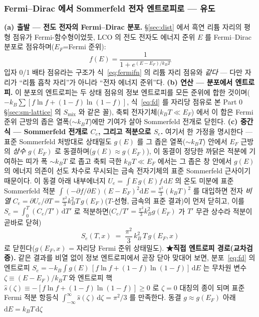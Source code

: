 \documentclass[11pt,a4paper]{article}
\newcommand{\dd}{\mathrm{d}}
\begin{document}
\subsubsection{Fermi--Dirac 에서 Sommerfeld 전자 엔트로피로 — 유도}\label{sec:lco-Se}
\textbf{(a) 출발 — 전도 전자의 Fermi--Dirac 분포.} \S\ref{sec:dist} 에서 흑연 리튬 자리의 평형 점유가 Fermi-함수형이었듯, LCO 의 전도 전자도 에너지 준위 $E$ 를
Fermi--Dirac 분포로 점유하며($E_F$=Fermi 준위):
\begin{equation}
f(E)=\frac{1}{1+e^{(E-E_F)/k_BT}}
\label{eq:fd}
\end{equation}
입자 0/1 배타 점유라는 구조가 식~\eqref{eq:fermifn} 의 리튬 자리 점유와 \emph{같다} — 다만 자리가 ``리튬 흡착
자리''가 아니라 ``전자 에너지 준위''다. \textbf{(b) 연산 — 분포에서 엔트로피.} 이 분포의 엔트로피는 두 상태 점유의 정보 엔트로피를 모든 준위에 합한 것이며($-k_B\sum[f\ln f+(1-f)\ln(1-f)]$,
식~\eqref{eq:fd} 를 자리당 점유로 본 Part 0 \S\ref{sec:sm-lattice} 의 $S_\mathrm{mix}$ 와 같은 꼴), 축퇴 전자기체($k_BT\!\ll\!E_F$)
에서 이 합은 Fermi 준위 근방의 좁은 열폭($\sim k_BT$)에만 기여가 살아 Sommerfeld 전개로 닫힌다. \textbf{(c) 중간식 — Sommerfeld 전개로 $C_e$, 그리고 적분으로 $S_e$.}
여기서 한 가정을 명시한다 — 표준 Sommerfeld 처방대로 상태밀도 $g(E)$ 를 그 좁은 열폭($\sim k_BT$) 안에서 $E_F$
근방의 \emph{상수} $g(E_F)$ 로 동결하며($g(E)\approx g(E_F)$), 이 동결이 정당한 까닭은 적분에 기여하는 띠가 폭
$\sim k_BT$ 로 좁고 축퇴 극한 $k_BT\!\ll\!E_F$ 에서는 그 좁은 창 안에서 $g(E)$ 의 에너지 의존이 선도 차수로
무시되는 금속 전자기체의 표준 Sommerfeld 근사이기 때문이다. 이 동결 아래 내부에너지 $U_e=\int E\,g(E)f\,\dd E$ 의
온도 미분에 표준 Sommerfeld 적분 $\int(-\partial f/\partial E)(E-E_F)^2\dd E=\tfrac{\pi^2}{3}(k_BT)^2$ 를 대입하면
전자 \emph{비열} $C_e=\partial U_e/\partial T=\tfrac{\pi^2}{3}k_B^2T\,g(E_F)$($T$-선형, 금속의 표준 결과)이 먼저
닫히고, 이를 $S_e=\int_0^T (C_e/T')\,\dd T'$ 로 적분하면($C_e/T'=\tfrac{\pi^2}{3}k_B^2g(E_F)$ 가 $T'$ 무관 상수라
적분이 곧바로 닫혀)
\begin{equation}
S_e(T,x)\;=\;\frac{\pi^2}{3}\,k_B^2\,T\,g(E_F,x)
\label{eq:Se}
\end{equation}
로 닫힌다($g(E_F,x)$ = 자리당 Fermi 준위 상태밀도). \textbf{★직접 엔트로피 경로(교차검증).} 같은 결과를 비열 없이 정보 엔트로피에서 곧장 닫아 맞대어 보면, 분포~\eqref{eq:fd} 의 엔트로피
$S_e=-k_B\int g(E)\,[f\ln f+(1-f)\ln(1-f)]\,\dd E$ 는 무차원 변수 $\zeta\equiv(E-E_F)/k_BT$ 와 엔트로피 핵
$\hat s(\zeta)\equiv-[f\ln f+(1-f)\ln(1-f)]\ge0$ 로 $\zeta=0$ 대칭의 종이 되며 표준 Fermi 적분 항등식
$\int_{-\infty}^{\infty}\hat s(\zeta)\,\dd\zeta=\pi^2/3$ 를 만족한다. 동결 $g\approx g(E_F)$ 아래 $\dd E=k_BT\,\dd\zeta$
\end{document}
